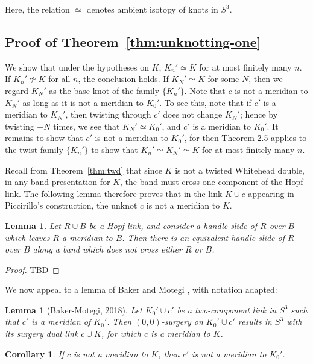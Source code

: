 \documentclass[11pt,usenames,dvipsnames,reqno]{amsart}
\numberwithin{theorem}{section}
\newtheorem{corollary}[theorem]{Corollary}
\newtheorem{lemma}[theorem]{Lemma}
\theoremstyle{ex}
\theoremstyle{rem}
\begin{document}
Here, the relation $\simeq$ denotes ambient isotopy of knots in $S^3$.

\subsection{Proof of Theorem~\ref{thm:unknotting-one}} We show that under the hypotheses on $K$, $K_n'\simeq K$ for at most finitely many $n$. If $K_n'\not\simeq K$ for all $n$, the conclusion holds. If $K_N'\simeq K$ for some $N$, then we regard $K_N'$ as the base knot of the family $\{K_n'\}$. Note that $c$ is not a meridian to $K_N'$ as long as it is not a meridian to $K_0'$. To see this, note that if $c'$ is a meridian to $K_N'$, then twisting through $c'$ does not change $K_N'$; hence by twisting $-N$ times, we see that $K_N'\simeq K_0'$, and $c'$ is a meridian to $K_0'$. It remains to show that $c'$ is not a meridian to $K_0'$, for then Theorem 2.5 applies to the twist family $\{K_n'\}$ to show that $K_n'\simeq K_N'\simeq K$ for at most finitely many $n$. 

Recall from Theorem~\ref{thm:twd} that since $K$ is not a twisted Whitehead double, in any band presentation for $K$, the band must cross one component of the Hopf link. The following lemma therefore proves that in the link $K\cup c$ appearing in Piccirillo's construction, the unknot $c$ is not a meridian to $K$.

\begin{lemma}
	Let $R\cup B$ be a Hopf link, and consider a handle slide of $R$ over $B$ which leaves $R$ a meridian to $B$. Then there is an equivalent handle slide of $R$ over $B$ along a band which does not cross either $R$ or $B$.
\end{lemma}
\begin{proof}
	TBD
\end{proof}

We now appeal to a lemma of Baker and Motegi \cite[Lemma 2.4]{baker-motegi}, with notation adapted:

\begin{lemma}[Baker-Motegi, 2018]
	Let $K_0'\cup c'$ be a two-component link in $S^3$ such that $c'$ is a meridian of $K_0'$. Then $(0,0)$-surgery on $K_0'\cup c'$ results in $S^3$ with its surgery dual link $c\cup K$, for which $c$ is a meridian to $K$.
\end{lemma}

\begin{corollary}
	If $c$ is not a meridian to $K$, then $c'$ is not a meridian to $K_0'$.
\end{corollary}
\end{document}
